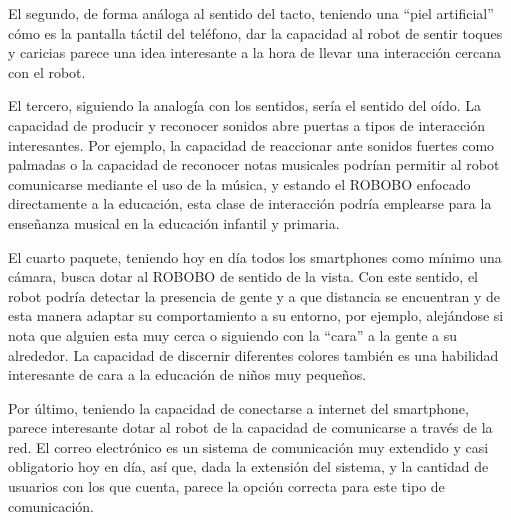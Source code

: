  El segundo, de forma análoga al sentido del tacto, teniendo una \enquote{piel artificial} cómo es la pantalla táctil del teléfono, dar la capacidad al robot de sentir toques y caricias parece una idea interesante a la hora de llevar una interacción cercana con el robot.
 
 El tercero, siguiendo la analogía con los sentidos, sería el sentido del oído. La capacidad de producir y reconocer sonidos abre puertas a tipos de interacción interesantes. Por ejemplo, la capacidad de reaccionar ante sonidos fuertes como palmadas o la capacidad de reconocer notas musicales podrían permitir al robot comunicarse mediante el uso de la música, y estando el ROBOBO enfocado directamente a la educación, esta clase de interacción podría emplearse para la enseñanza musical en la educación infantil y primaria.
 
 El cuarto paquete, teniendo hoy en día todos los smartphones como mínimo una cámara, busca dotar al ROBOBO de sentido de la vista. Con este sentido, el robot podría detectar la presencia de gente y a que distancia se encuentran y de esta manera adaptar su comportamiento a su entorno, por ejemplo, alejándose si nota que alguien esta muy cerca o siguiendo con la \enquote{cara} a la gente a su alrededor. La capacidad de discernir diferentes colores también es una habilidad interesante de cara a la educación de niños muy pequeños.
 
 Por último, teniendo la capacidad de conectarse a internet del smartphone, parece interesante dotar al robot de la capacidad de comunicarse a través de la red. El correo electrónico es un sistema de comunicación muy extendido y casi obligatorio hoy en día, así que, dada la extensión del sistema, y la cantidad de usuarios con los que cuenta, parece la opción correcta para este tipo de comunicación.
 
  
